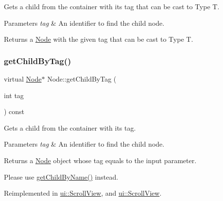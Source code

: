 Gets a child from the container with its tag that can be cast to Type T.


\begin{DoxyParams}{Parameters}
{\em tag} & An identifier to find the child node.\\
\hline
\end{DoxyParams}
\begin{DoxyReturn}{Returns}
a \hyperlink{classNode}{Node} with the given tag that can be cast to Type T. 
\end{DoxyReturn}
\mbox{\label{classNode_ac2fa47ea7ec6663e4cfe0580da7131f5}} 
\subsubsection{\texorpdfstring{get\+Child\+By\+Tag()}{getChildByTag()}\hspace{0.1cm}{\footnotesize\ttfamily [3/4]}}
{\footnotesize\ttfamily virtual \hyperlink{classNode}{Node}$\ast$ Node\+::get\+Child\+By\+Tag (\begin{DoxyParamCaption}\item[{int}]{tag }\end{DoxyParamCaption}) const\hspace{0.3cm}{\ttfamily [virtual]}}

Gets a child from the container with its tag.


\begin{DoxyParams}{Parameters}
{\em tag} & An identifier to find the child node.\\
\hline
\end{DoxyParams}
\begin{DoxyReturn}{Returns}
a \hyperlink{classNode}{Node} object whose tag equals to the input parameter.
\end{DoxyReturn}
Please use {\ttfamily \hyperlink{classNode_ac2f84f995c7d6581787abaa3b09c4518}{get\+Child\+By\+Name()}} instead. 

Reimplemented in \hyperlink{classui_1_1ScrollView_a0b4781b276e8040776a7ec93eb54792e}{ui\+::\+Scroll\+View}, and \hyperlink{classui_1_1ScrollView_a0c523b2f58f7916aa9aaf7bcab4781a7}{ui\+::\+Scroll\+View}.

\mbox{\label{classNode_a093e82df91d1c2df7d55e5b1b319012b}} 
